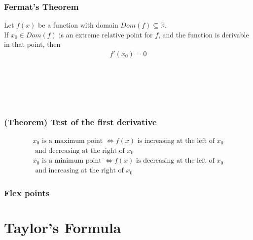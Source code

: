 \documentclass[a4paper]{report}
\begin{document}
\subsubsection{Fermat's Theorem}
\begin{tcolorbox}
Let $f\left ( x \right )$ be a function with domain $Dom\left ( f \right )\subseteq \mathbb{R}$.\\If $x_{0}\in Dom\left ( f \right )$ is an extreme relative point for $f$, and the function is derivable in that point, then
\begin{align}
f'\left ( x_{0} \right )=0
\end{align}
\end{tcolorbox}
\\ \\ \\ \\ 

\subsubsection{(Theorem) Test of the first derivative}
\begin{tcolorbox}
\begin{align}
    x_{0} \text{ is a maximum point } \Leftrightarrow f\left ( x \right ) \text{ is increasing at the left of } x_{0}\\ \text{ and decreasing at the right of } x_{0}
\end{align}
\begin{align}
    x_{0} \text{ is a minimum point } \Leftrightarrow f\left ( x \right ) \text{ is decreasing at the left of } x_{0}\\ \text{ and increasing at the right of } x_{0}
\end{align}
\end{tcolorbox}
\subsubsection{Flex points} %
\section{Taylor's Formula}
\end{document}
